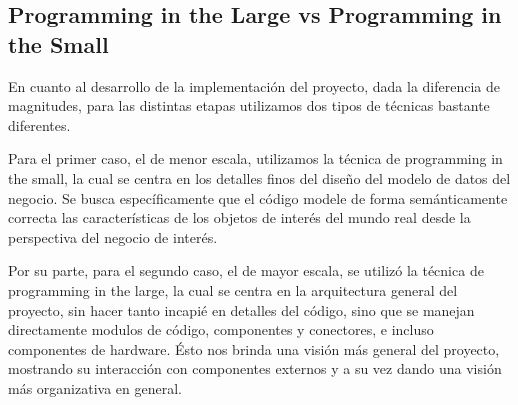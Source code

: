 \subsection{Programming in the Large vs Programming in the Small}
En cuanto al desarrollo de la implementaci\'on del proyecto, dada la diferencia de magnitudes, para las distintas etapas utilizamos dos tipos de t\'ecnicas bastante diferentes. 

Para el primer caso, el de menor escala, utilizamos la t\'ecnica de programming in the small, la cual se centra en los detalles finos del dise\~no del modelo de datos del negocio. Se busca específicamente que el c\'odigo modele de forma sem\'anticamente correcta las caracter\'isticas de los objetos de inter\'es del mundo real desde la perspectiva del negocio de inter\'es.

Por su parte, para el segundo caso, el de mayor escala, se utiliz\'o la t\'ecnica de programming in the large, la cual se centra en la arquitectura general del proyecto, sin hacer tanto incapi\'e en detalles del c\'odigo, sino que se manejan directamente modulos de c\'odigo, componentes y conectores, e incluso componentes de hardware. Ésto nos brinda una visi\'on m\'as general del proyecto, mostrando su interacci\'on con componentes externos y a su vez dando una visi\'on m\'as organizativa en general.